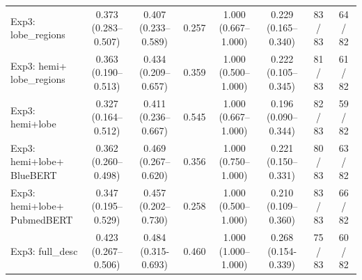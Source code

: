 \documentclass[a4paper,12pt]{article}
\begin{document}
\begin{table}[ht]
\begin{threeparttable}
\begin{tabular}{lccccccc}
Exp3: lobe\_regions  &
\makecell{\colorbox{orange!20}{0.373}\\(0.283--0.507)} &
\makecell{0.407\\(0.233--0.589)} &
0.257 &
\makecell{1.000\\(0.667--1.000)} &
\makecell{\colorbox{orange!20}{0.229}\\(0.165--0.340)} &
\colorbox{green!20}{83 / 83} & 
\colorbox{blue!20}{64 / 82} \\

Exp3: \makecell{hemi+\\lobe\_regions}  &
\makecell{0.363\\(0.190--0.513)} &
\makecell{0.434\\(0.209--0.657)} &
0.359 &
\makecell{1.000\\(0.500--1.000)} &
\makecell{0.222\\(0.105--0.345)} &
\colorbox{orange!20}{81 / 83} &
61 / 82 \\

Exp3: hemi+lobe  &
\makecell{0.327\\(0.164--0.512)} &
\makecell{0.411\\(0.236--0.667)} &
\colorbox{green!20}{0.545} &
\makecell{1.000\\(0.667--1.000)} &
\makecell{0.196\\(0.090--0.344)} &
\colorbox{blue!20}{82 / 83} &
59 / 82 \\

Exp3: \makecell{hemi+lobe+\\BlueBERT} &
\makecell{0.362\\(0.260--0.498)} &
\makecell{\colorbox{blue!20}{0.469}\\(0.267--0.620)} &
0.356 &
\makecell{1.000\\(0.750--1.000)} &
\makecell{0.221\\(0.150--0.331)} &
80 / 83 &
\colorbox{orange!20}{63 / 82} \\

Exp3: \makecell{hemi+lobe+ \\ PubmedBERT} &
\makecell{0.347\\(0.195--0.529)} &
\makecell{\colorbox{orange!20}{0.457}\\(0.202--0.730)} &
0.258 &
\makecell{1.000 \\ (0.500--1.000)} &
\makecell{0.210\\(0.109--0.360)} &
\colorbox{green!20}{83 / 83} &
\colorbox{green!20}{66 / 82} \\

Exp3: full\_desc  &
\makecell{\colorbox{green!20}{0.423}\\(0.267--0.506)} &
\makecell{\colorbox{green!20}{0.484}\\(0.315-0.693)} &
0.460 &
\makecell{1.000 \\ (1.000--1.000)} &
\makecell{\colorbox{green!20}{0.268}\\(0.154-0.339)} &
75 / 83 &
60 / 82 \\


\end{tabular}
\end{threeparttable}
\end{table}
\end{document}

